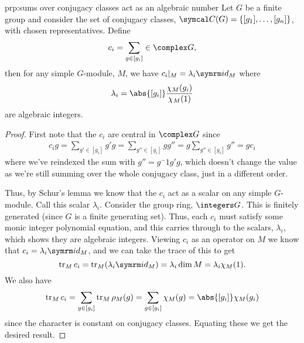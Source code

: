 \begin{prp}{}{prp:sums over conjugacy classes act as an algebraic number}
    Let \(G\) be a finite group and consider the set of conjugacy classes, \(\conjugacyClasses(G) = \{[g_1], \dotsc, [g_n]\}\), with chosen representatives.
    Define
    \begin{equation}
        c_i = \sum_{g \in [g_i]} \in \complex G,
    \end{equation}
    then for any simple \(G\)-module, \(M\), we have \(c_i|_M = \lambda_i \id_M\) where
    \begin{equation}
        \lambda_i = \abs{[g_i]} \frac{\chi_M(g_i)}{\chi_M(1)}
    \end{equation}
    are algebraic integers.
    \begin{proof}
        First note that the \(c_i\) are central in \(\complex G\) since
        \begin{align}
            c_i g = \sum_{g' \in [g_i]} g'g = \sum_{g'' \in [g_i]} gg'' = g \sum_{g'' \in [g_i]} g'' = g c_i
        \end{align}
        where we've reindexed the sum with \(g'' = g^-1 g'g\), which doesn't change the value as we're still summing over the whole conjugacy class, just in a different order.
        
        Thus, by Schur's lemma we know that the \(c_i\) act as a scalar on any simple \(G\)-module.
        Call this scalar \(\lambda_i\).
        Consider the group ring, \(\integers G\).
        This is finitely generated (since \(G\) is a finite generating set).
        Thus, each \(c_i\) must satisfy some monic integer polynomial equation, and this carries through to the scalars, \(\lambda_i\), which shows they are algebraic integers.
        Viewing \(c_i\) as an operator on \(M\) we know that \(c_i = \lambda_i \id_M\), and we can take the trace of this to get
        \begin{equation}
            \tr_M c_i = \tr_M (\lambda_i \id_M) = \lambda_i \dim M = \lambda_i \chi_M(1).
        \end{equation}
        We also have
        \begin{equation}
            \tr_M c_i = \sum_{g \in [g_i]} \tr_M \rho_M(g) = \sum_{g \in [g_i]} \chi_M(g) = \abs{[g_i]} \chi_M(g_i)
        \end{equation}
        since the character is constant on conjugacy classes.
        Equating these we get the desired result.
    \end{proof}
\end{prp}

